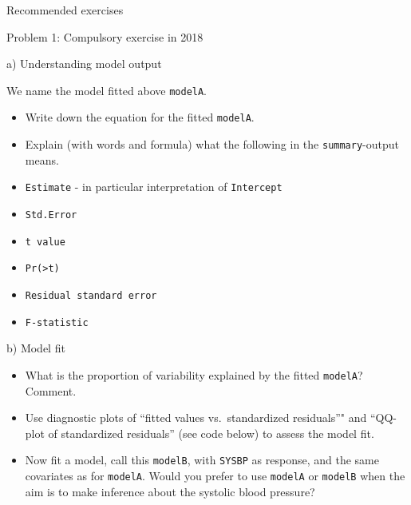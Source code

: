 \documentclass[ignorenonframetext,]{beamer}
\providecommand{\tightlist}{%
  \setlength{\itemsep}{0pt}\setlength{\parskip}{0pt}}
\begin{document}
\begin{frame}[fragile]{Recommended exercises}
\begin{block}{Problem 1: Compulsory exercise in 2018}
\end{block}

\begin{block}{a) Understanding model output}

We name the model fitted above \texttt{modelA}.

\begin{itemize}
\tightlist
\item
  Write down the equation for the fitted \texttt{modelA}.
\item
  Explain (with words and formula) what the following in the
  \texttt{summary}-output means.
\item
  \texttt{Estimate} - in particular interpretation of \texttt{Intercept}
\item
  \texttt{Std.Error}
\item
  \texttt{t\ value}
\item
  \texttt{Pr(\textgreater{}\textbar{}t\textbar{})}
\item
  \texttt{Residual\ standard\ error}
\item
  \texttt{F-statistic}
\end{itemize}

\end{block}

\begin{block}{b) Model fit}

\begin{itemize}
\tightlist
\item
  What is the proportion of variability explained by the fitted
  \texttt{modelA}? Comment.
\item
  Use diagnostic plots of ``fitted values vs.~standardized residuals''"
  and ``QQ-plot of standardized residuals'' (see code below) to assess
  the model fit.
\item
  Now fit a model, call this \texttt{modelB}, with \texttt{SYSBP} as
  response, and the same covariates as for \texttt{modelA}. Would you
  prefer to use \texttt{modelA} or \texttt{modelB} when the aim is to
  make inference about the systolic blood pressure?
\end{itemize}


\end{block}
\end{frame}
\end{document}
